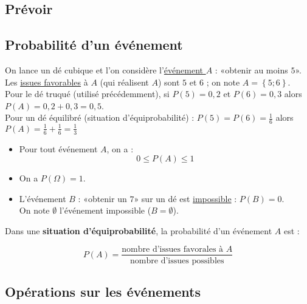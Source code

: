 \documentclass[a4paper,11pt]{article} \usepackage{FBarticle} \mapage{831}{Probabilités 1} %
\begin{document}
\newpage
\begin{multicols}{2}
\section{Prévoir}
\subsection{Probabilité d'un événement}
\exem On lance un dé cubique et l'on considère l'\underline{événement $A$} : «obtenir au moins $5$».
Les \underline{issues favorables} à $A$ (qui réalisent $A$) sont $5$ et $6$ ; on note $A=\left\{5;6\right\}$.\\
Pour le dé truqué (utilisé précédemment), si $P(5)=0,2$ et $P(6)=0,3$ alors $P(A)=0,2+0,3=0,5$.\\
Pour un dé équilibré (situation d'équiprobabilité) : $P(5)=P(6)=\frac{1}{6}$ alors $P(A)=\frac{1}{6}+\frac{1}{6}=\frac{1}{3}$\par
{}\par
\prop \begin{itemize}
\item Pour tout événement $A$, on a :
$$0\leqslant P(A)\leqslant 1$$
\item On a $P(\Omega)=1$.
\item L'événement $B$ : «obtenir un $7$» sur un dé est \underline{impossible} : $P(B)=0$.\\ On note $\emptyset$ l'événement impossible ($B=\emptyset$).
\end{itemize}\par

\prop Dans une \textbf{situation d'équiprobabilité}, la probabilité d'un événement $A$ est :

$$P(A)=\frac{\textrm{nombre d'issues favorales à }A}{\textrm{nombre d'issues possibles}}$$


\subsection{Opérations sur les événements}


\end{multicols}
\end{document}
